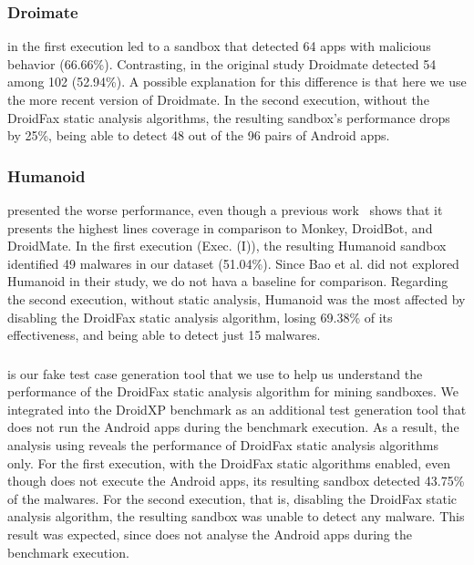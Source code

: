 \subsubsection*{Droimate} in the first execution led to a sandbox that detected 64 apps with malicious behavior (66.66\%). Contrasting, in the original study Droidmate detected 54 among 102 (52.94\%). A possible explanation for this difference is that here we use the more recent version of Droidmate. In the second execution, without the DroidFax static analysis algorithms, the resulting sandbox's performance drops by 25\%, being able to detect 48 out of the 96 pairs of Android apps. 


\subsubsection*{Humanoid} presented the worse performance, even though a previous
work~\cite{DBLP:conf/kbse/LiY0C19} shows that it presents the highest lines coverage in comparison to Monkey, DroidBot, and DroidMate. In the first execution (Exec. (I)), the resulting Humanoid sandbox identified 49 malwares in our dataset (51.04\%). Since Bao et al. did not explored Humanoid in their study, we do not hava a baseline for comparison. Regarding the second execution, without static analysis, Humanoid was the most affected by disabling the DroidFax static analysis algorithm, losing 69.38\% of its effectiveness, and being able to detect just 15 malwares.

\subsubsection*{\joke} is our fake test case generation tool that we use to help us understand the performance of the DroidFax static analysis algorithm for mining sandboxes. We integrated \joke into the DroidXP benchmark as an additional test generation tool that does not run the Android apps during the benchmark execution. As a result, the analysis using \joke reveals the performance of DroidFax static analysis algorithms only. For the first execution, with the DroidFax static algorithms enabled, even though \joke does not execute the Android apps, its resulting sandbox detected 43.75\% of the malwares. For the second execution, that is, disabling the DroidFax static analysis algorithm, the resulting \joke sandbox was unable to detect any malware. This result was expected, since \joke does not analyse the Android apps during the benchmark execution.

